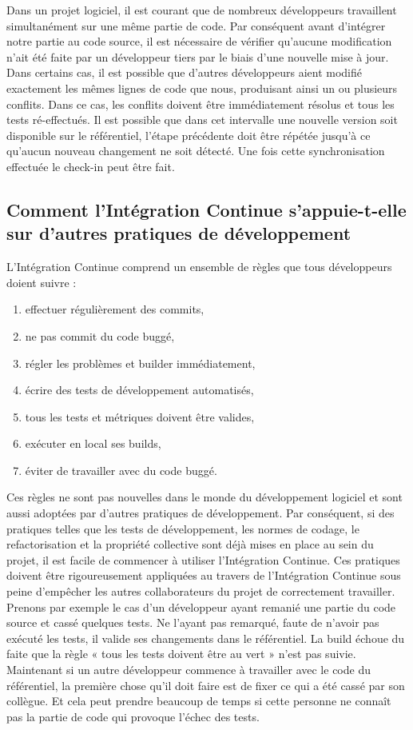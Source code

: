     Dans un projet logiciel, il est courant que de nombreux développeurs travaillent simultanément sur une même partie de code.  Par conséquent avant d’intégrer notre partie au code source, il est nécessaire de vérifier qu’aucune modification n’ait été faite par un développeur tiers par le biais d’une nouvelle mise à jour. Dans certains cas, il est possible que d’autres développeurs aient modifié exactement les mêmes lignes de code que nous, produisant ainsi un ou plusieurs conflits. Dans ce cas, les conflits doivent être immédiatement résolus et tous les tests ré-effectués. Il est possible que dans cet intervalle une nouvelle version soit disponible sur le référentiel, l'étape précédente doit être répétée jusqu'à ce qu'aucun nouveau changement ne soit détecté. Une fois cette synchronisation effectuée le check-in peut être fait.

    \subsection{Comment l’Intégration Continue s’appuie-t-elle sur d’autres pratiques de développement}
    L’Intégration Continue comprend un ensemble de règles que tous développeurs doient suivre :

    \begin{enumerate}
      \item effectuer régulièrement des commits,
      \item ne pas commit du code buggé,
      \item régler les problèmes et builder immédiatement,
      \item écrire des tests de développement automatisés,
      \item tous les tests et métriques doivent être valides,
      \item exécuter en local ses builds,
      \item éviter de travailler avec du code buggé.\\
    \end{enumerate}

    Ces règles ne sont pas nouvelles dans le monde du développement logiciel et sont aussi adoptées par d'autres pratiques de développement. Par conséquent, si des pratiques telles que les tests de développement, les normes de codage, le refactorisation et la propriété collective sont déjà mises en place au sein du projet, il est facile de commencer à utiliser l’Intégration Continue. Ces pratiques doivent être rigoureusement appliquées au travers de l’Intégration Continue sous peine d’empêcher les autres collaborateurs du projet de correctement travailler. Prenons par exemple le cas d’un développeur ayant remanié une partie du code source et cassé quelques tests. Ne l’ayant pas remarqué, faute de n’avoir pas exécuté les tests, il valide ses changements dans le référentiel. La build échoue du faite que la règle « tous les tests doivent être au vert » n’est pas suivie. Maintenant si un autre développeur commence à travailler avec le code du référentiel, la première chose qu'il doit faire est de fixer ce qui a été cassé par son collègue. Et cela peut prendre beaucoup de temps si cette personne ne connaît pas la partie de code qui provoque l’échec des tests.

